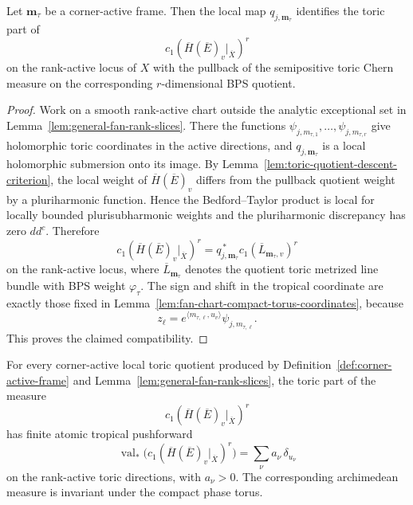 \documentclass[10pt,a4paper]{amsart}
\theoremstyle{plain}
\theoremstyle{plain}
\numberwithin{equation}{section}
\providecommand{\bE}{\overline{E}}
\begin{document}
\begin{prop}
	\label{prop:rank-active-bps-quotient-compatibility}
	Let \(\mathbf m_\tau\) be a corner-active frame.  Then the local map
	\(q_{j,\mathbf m_\tau}\) identifies the toric part of
	\[
	c_1(\overline H(\bE)_v|_{\overline X})^{r}
	\]
	on the rank-active locus of \(X\) with the pullback of the semipositive toric
	Chern measure on the corresponding \(r\)-dimensional BPS quotient.
\end{prop}

\begin{proof}
	Work on a smooth rank-active chart outside the analytic exceptional set in
	Lemma~\ref{lem:general-fan-rank-slices}.  There the functions
	\(\psi_{j,m_{\tau,1}},\ldots,\psi_{j,m_{\tau,r}}\) give holomorphic toric
	coordinates in the active directions, and \(q_{j,\mathbf m_\tau}\) is a local
	holomorphic
	submersion onto its image.  By
	Lemma~\ref{lem:toric-quotient-descent-criterion}, the local weight of
	\(\overline H(\bE)_v\) differs from the pullback quotient weight by a
	pluriharmonic function.  Hence the Bedford--Taylor product is local for
	locally bounded plurisubharmonic weights and the pluriharmonic discrepancy
	has zero \(dd^c\).  Therefore
	\[
	c_1(\overline H(\bE)_v|_{\overline X})^{r}
	=
	q_{j,\mathbf m_\tau}^{\,*}
	c_1(\overline L_{\mathbf m_\tau,v})^{r}
	\]
	on the rank-active locus, where \(\overline L_{\mathbf m_\tau}\) denotes the
	quotient toric metrized line bundle with BPS weight
	\(\varphi_{\tau}\).  The sign and shift in the tropical coordinate are
	exactly those fixed in Lemma~\ref{lem:fan-chart-compact-torus-coordinates},
	because
	\[
	z_\ell=e^{\langle m_{\tau,\ell},u_v\rangle}\psi_{j,m_{\tau,\ell}}.
	\]
	This proves the claimed compatibility.
\end{proof}

\begin{prop}
	\label{input:bps-relative-atomic-tropical-pushforward}
	For every corner-active local toric quotient produced by
	Definition~\ref{def:corner-active-frame} and
	Lemma~\ref{lem:general-fan-rank-slices}, the toric part of the measure
	\[
	c_1(\overline H(\bE)_v|_{\overline X})^{r}
	\]
	has finite atomic tropical pushforward
	\[
	\operatorname{val}_*
	\bigl(c_1(\overline H(\bE)_v|_{\overline X})^{r}\bigr)
	=\sum_\nu a_\nu\,\delta_{u_\nu}
	\]
	on the rank-active toric directions, with \(a_\nu>0\).  The corresponding
	archimedean measure is invariant under the compact phase torus.
\end{prop}
\end{document}
